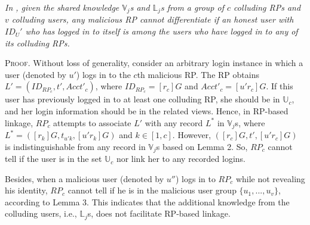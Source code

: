 {{\vspace{1mm}
 {\em
In \usso, given the shared knowledge $\mathbb{V}_j$s and $\mathbb{L}_j$s from a group of $c$ colluding RPs and $v$ colluding users, any malicious RP cannot differentiate if an honest user with $ID_U'$ who has logged in to itself is among the users who have logged in to any of its colluding RPs.}


\vspace{0.75mm}
\noindent\textsc{Proof.} Without loss of generality, consider an arbitrary login instance in which a user (denoted by $u'$) logs in to the $c$th malicious RP. The RP obtains $L'=(ID_{RP_c}, t', Acct'_c)$, where $ID_{RP_c}=[r_c]G$ and $Acct'_c=[u'r_c]G$. If this user has previously logged in to at least one colluding RP, she should be in $\mathbb{U}_c$, and her login information should be in the related views. Hence, in RP-based linkage, $RP_c$ attempts to associate $L'$ with any record $L^*$ in $\mathbb{V}_j$s, where $L^*=([r_k]G, t_{u'k}, [u'r_k]G)$ and $k \in [1,c]$.
However, $([r_c]G, t', [u'r_c]G)$ is indistinguishable from %
any record in $\mathbb{V}_j$s based on Lemma 2. So, $RP_c$ cannot tell if the user is in the set $\mathbb{U}_c$ nor link her to any recorded logins.

Besides, when a malicious user (denoted by $u''$) logs in to $RP_c$ while not revealing his identity, $RP_c$ cannot tell if he is in the malicious user group $\{u_1,...,u_v\}$, according to Lemma 3. This indicates that the additional knowledge from the colluding users, i.e., $\mathbb{L}_j$s, does not facilitate RP-based linkage.


}}
